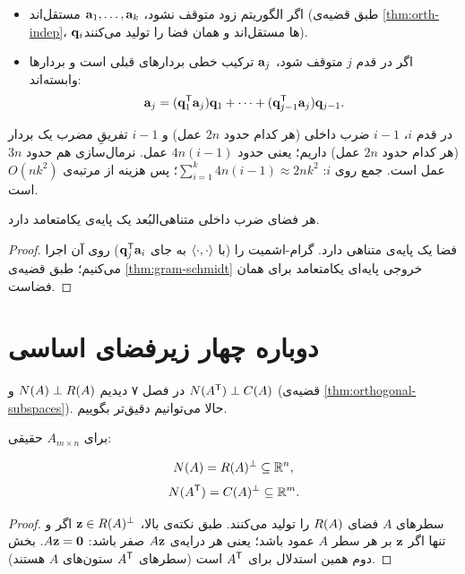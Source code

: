 \begin{note}
\begin{itemize}
  \item اگر الگوریتم زود متوقف نشود، $\mathbf{a}_1,\dots,\mathbf{a}_k$ مستقل‌اند (طبق قضیه‌ی \ref{thm:orth-indep}، $\mathbf{q}_i$ها مستقل‌اند و همان فضا را تولید می‌کنند).
  \item اگر در قدم $j$ متوقف شود، $\mathbf{a}_j$ ترکیب خطی بردارهای قبلی است و بردارها وابسته‌اند:
  \[
  \mathbf{a}_j=(\mathbf{q}_1^{\mathsf{T}}\mathbf{a}_j)\mathbf{q}_1+\dots+(\mathbf{q}_{j-1}^{\mathsf{T}}\mathbf{a}_j)\mathbf{q}_{j-1}.
  \]
\end{itemize}
\end{note}

\begin{note}[پیچیدگی: $O(nk^2)$]
در قدم $i$، $i-1$ ضرب داخلی (هر کدام حدود $2n$ عمل) و $i-1$ تفریقِ مضرب یک بردار (هر کدام حدود $2n$ عمل) داریم؛ یعنی حدود $4n(i-1)$ عمل. نرمال‌سازی هم حدود $3n$ عمل است. جمع روی $i$:
$\sum_{i=1}^k 4n(i-1)\approx 2nk^2$؛ پس هزینه از مرتبه‌ی $O(nk^2)$ است.
\end{note}

\begin{corollary}\label{cor:onb-exists}
هر فضای ضرب داخلی متناهی‌البُعد  یک پایه‌ی یکامتعامد دارد.
\end{corollary}
\begin{proof}
فضا یک پایه‌ی متناهی دارد. گرام-اشمیت را (با $\left\langle \cdot,\cdot\right\rangle$ به جای $\mathbf{q}_j^{\mathsf{T}}\mathbf{a}_i$) روی آن اجرا می‌کنیم؛ طبق قضیه‌ی \ref{thm:gram-schmidt} خروجی پایه‌ای یکامتعامد برای همان فضاست.
\end{proof}

\section{دوباره چهار زیرفضای اساسی}

در فصل ۷ دیدیم $N(A)\perp R(A)$ و $N(A^{\mathsf{T}})\perp C(A)$ (قضیه‌ی \ref{thm:orthogonal-subspaces}). حالا می‌توانیم دقیق‌تر بگوییم.

\begin{theorem}\label{thm:four-complements}
برای $A_{m\times n}$ حقیقی:
\begin{keyformula}
\[
N(A)=R(A)^\perp\subseteq\mathbb{R}^n,
\]
\[
N(A^{\mathsf{T}})=C(A)^\perp\subseteq\mathbb{R}^m .
\]
\end{keyformula}
\end{theorem}
\begin{proof}
سطرهای $A$ فضای $R(A)$ را تولید می‌کنند. طبق نکته‌ی بالا، $\mathbf{z}\in R(A)^\perp$ اگر و تنها اگر $\mathbf{z}$ بر هر سطر $A$ عمود باشد؛ یعنی هر درایه‌ی $A\mathbf{z}$ صفر باشد: $A\mathbf{z}=\mathbf{0}$. بخش دوم همین استدلال برای $A^{\mathsf{T}}$ است (سطرهای $A^{\mathsf{T}}$ ستون‌های $A$ هستند).
\end{proof}


